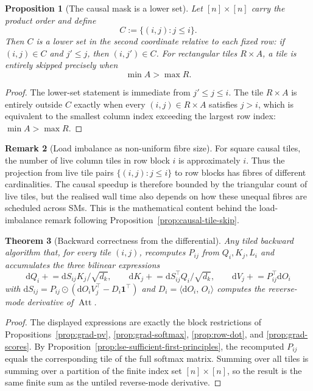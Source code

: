 \documentclass[11pt]{amsart}
\theoremstyle{plain}
\newtheorem{theorem}{Theorem}[section]
\newtheorem{proposition}[theorem]{Proposition}
\theoremstyle{definition}
\newtheorem{remark}[theorem]{Remark}
\newcommand{\Att}{\operatorname{Att}}
\newcommand{\inner}[2]{\langle #1,\, #2 \rangle}
\begin{document}
\begin{proposition}[The causal mask is a lower set]
\label{prop:causal-lower-set}
Let $[n]\times[n]$ carry the product order and define
\[
    C := \{(i,j) : j \leq i\}.
\]
Then $C$ is a lower set in the second coordinate relative to each fixed row:
if $(i,j)\in C$ and $j'\leq j$, then $(i,j')\in C$.  For rectangular tiles
$R\times A$, a tile is entirely skipped precisely when
\[
    \min A > \max R.
\]
\end{proposition}
\begin{proof}
The lower-set statement is immediate from $j'\leq j\leq i$.  The tile
$R\times A$ is entirely outside $C$ exactly when every $(i,j)\in R\times A$
satisfies $j>i$, which is equivalent to the smallest column index exceeding
the largest row index: $\min A>\max R$.
\end{proof}

\begin{remark}[Load imbalance as non-uniform fibre size]
For square causal tiles, the number of live column tiles in row block $i$ is
approximately $i$.  Thus the projection from live tile pairs
$\{(i,j):j\leq i\}$ to row blocks has fibres of different cardinalities.
The causal speedup is therefore bounded by the triangular count of live
tiles, but the realised wall time also depends on how these unequal fibres
are scheduled across SMs.  This is the mathematical content behind the
load-imbalance remark following Proposition~\ref{prop:causal-tile-skip}.
\end{remark}

\begin{theorem}[Backward correctness from the differential]
\label{thm:flash2-backward-first-principles}
Any tiled backward algorithm that, for every tile $(i,j)$, recomputes
$P_{ij}$ from $Q_i,K_j,L_i$ and accumulates the three bilinear expressions
\[
    \mathrm{d}Q_i \mathrel{+}= \mathrm{d}S_{ij}K_j/\sqrt{d_k},\qquad
    \mathrm{d}K_j \mathrel{+}= \mathrm{d}S_{ij}^{\top}Q_i/\sqrt{d_k},\qquad
    \mathrm{d}V_j \mathrel{+}= P_{ij}^{\top}\mathrm{d}O_i
\]
with $\mathrm{d}S_{ij}=P_{ij}\odot(\mathrm{d}O_iV_j^\top-D_i\mathbf{1}^\top)$
and $D_i=\inner{\mathrm{d}O_i}{O_i}$ computes the reverse-mode derivative of
$\Att$.
\end{theorem}
\begin{proof}
The displayed expressions are exactly the block restrictions of
Propositions~\ref{prop:grad-pv}, \ref{prop:grad-softmax},
\ref{prop:row-dot}, and \ref{prop:grad-scores}.  By
Proposition~\ref{prop:lse-sufficient-first-principles}, the recomputed
$P_{ij}$ equals the corresponding tile of the full softmax matrix.  Summing
over all tiles is summing over a partition of the finite index set
$[n]\times[n]$, so the result is the same finite sum as the untiled
reverse-mode derivative.
\end{proof}
\end{document}
